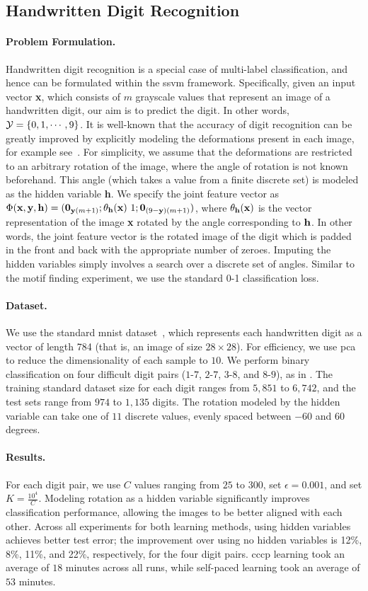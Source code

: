 \documentclass{article}
\newcommand{\mysubsection}[1]{\vspace{-3mm}\subsection{#1}\vspace{-3mm}}
\newcommand{\myparagraph}[1]{\vspace{-2mm}\paragraph{#1}}
\begin{document}
\mysubsection{Handwritten Digit Recognition}
\label{subsec:digits}

\paragraph{Problem Formulation.}
Handwritten digit recognition is a special case of multi-label classification, and hence
can be formulated within the {\sc ssvm} framework.
Specifically, given an input vector {\bf x}, which consists of $m$ grayscale values
that represent an image of a handwritten digit, our aim is to predict the digit.
In other words, ${\cal Y} = \{0,1,\cdots,9\}$. It is well-known that the accuracy
of digit recognition can be greatly improved by explicitly modeling the deformations
present in each image, for example see~\cite{simardnips91}. For simplicity, we assume that
the deformations are restricted to an arbitrary rotation of the image, where the 
angle of rotation is not known beforehand. This angle (which takes a value from
a finite discrete set) is modeled as the hidden variable
{\bf h}. We specify the joint feature vector as
$\Phi({\bf x},{\bf y},{\bf h}) = ({\bf 0}_{{\bf y}(m+1)};\theta_{\bf
  h}({\bf x})\ 1;{\bf 0}_{(9-{\bf y})(m+1)})$, 
where $\theta_{\bf h}({\bf x})$ is the vector representation of the
image {\bf x} rotated by 
the angle corresponding to ${\bf h}$.
In other words, the joint feature vector is the rotated image of the digit
which is padded in the front and back with the appropriate number of
zeroes. Imputing the hidden variables simply involves a search over a
discrete set of angles.  Similar to the motif finding experiment, we
use the standard 0-1 classification loss.

\myparagraph{Dataset.}

We use the standard {\sc mnist} dataset~\cite{lecunieee98}, which
represents each handwritten digit as a vector of length 784 (that is,
an image of size $28\times 28$). For efficiency, we use {\sc pca} to
reduce the dimensionality of each sample to $10$. We perform binary
classification on four difficult digit pairs ($1$-$7$, $2$-$7$,
$3$-$8$, and $8$-$9$), as in \cite{zhangicml07}. The training standard
dataset size for each digit ranges from $5,851$ to $6,742$, and the
test sets range from $974$ to $1,135$ digits. The rotation modeled by
the hidden variable can take one of $11$ discrete values, evenly
spaced between $-60$ and $60$ degrees.

\myparagraph{Results.}

For each digit pair, we use $C$ values ranging from $25$ to $300$, set
$\epsilon=0.001$, and set $K = \frac{10^4}{C}$. Modeling rotation as a
hidden variable significantly improves classification performance,
allowing the images to be better aligned with each other. Across all
experiments for both learning methods, using hidden variables achieves
better test error; the improvement over using no hidden variables is
12\%, 8\%, 11\%, and 22\%, respectively, for the four digit
pairs. {\sc cccp} learning took an average of $18$ minutes across all
runs, while self-paced learning took an average of $53$ minutes.
\end{document}
